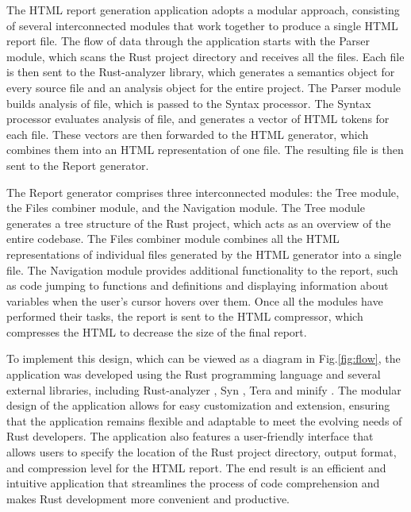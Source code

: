 The HTML report generation application adopts a modular approach, consisting of several interconnected modules that work together to produce a single HTML report file. The flow of data through the application starts with the Parser module, which scans the Rust project directory and receives all the files. Each file is then sent to the Rust-analyzer library, which generates a semantics object for every source file and an analysis object for the entire project. The Parser module builds analysis of file, which is passed to the Syntax processor. The Syntax processor evaluates analysis of file, and generates a vector of HTML tokens for each file. These vectors are then forwarded to the HTML generator, which combines them into an HTML representation of one file. The resulting file is then sent to the Report generator.

The Report generator comprises three interconnected modules: the Tree module, the Files combiner module, and the Navigation module. The Tree module generates a tree structure of the Rust project, which acts as an overview of the entire codebase. The Files combiner module combines all the HTML representations of individual files generated by the HTML generator into a single file. The Navigation module provides additional functionality to the report, such as code jumping to functions and definitions and displaying information about variables when the user's cursor hovers over them. Once all the modules have performed their tasks, the report is sent to the HTML compressor, which compresses the HTML to decrease the size of the final report.

To implement this design, which can be viewed as a diagram in Fig.\ref{fig:flow}, the application was developed using the Rust programming language and several external libraries, including Rust-analyzer \cite{crates-rust-analyzer}, Syn \cite{crates-syn}, Tera \cite{tera-official} and minify \cite{minify-github}. The modular design of the application allows for easy customization and extension, ensuring that the application remains flexible and adaptable to meet the evolving needs of Rust developers. The application also features a user-friendly interface that allows users to specify the location of the Rust project directory, output format, and compression level for the HTML report. The end result is an efficient and intuitive application that streamlines the process of code comprehension and makes Rust development more convenient and productive.


